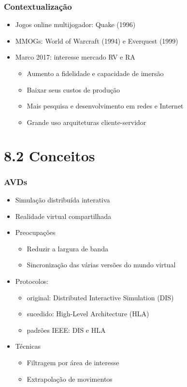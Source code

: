 \documentclass{beamer}
\begin{document}
\begin{frame}
  \frametitle{Contextualização}
    \begin{itemize}
      \item Jogos online multijogador: Quake (1996)
      \item MMOGs: World of Warcraft (1994) e Everquest (1999)
      \item Marco 2017: interesse mercado RV e RA
      \begin{itemize}
        \item Aumento a fidelidade e capacidade de imersão
        \item Baixar seus custos de produção
        \item Mais pesquisa e desenvolvimento em redes e Internet
        \item Grande uso arquiteturas cliente-servidor
      \end{itemize}
    \end{itemize}
  \end{frame}
  
  \section{8.2 Conceitos}
  \begin{frame}
    \frametitle{AVDs}
    \begin{itemize}
      \item Simulação distribuída interativa
      \item Realidade virtual compartilhada
      \item Preocupações
      \begin{itemize}
        \item Reduzir a largura de banda
        \item Sincronização das várias versões do mundo virtual
      \end{itemize}
      \item Protocolos:
      \begin{itemize}
        \item original: Distributed Interactive Simulation (DIS)
        \item sucedido: High-Level Architecture (HLA)
        \item padrões IEEE: DIS e HLA
      \end{itemize}
      \item Técnicas
      \begin{itemize}
        \item Filtragem por área de interesse
        \item Extrapolação de movimentos
      \end{itemize}
    \end{itemize}
\end{frame}
\end{document}
